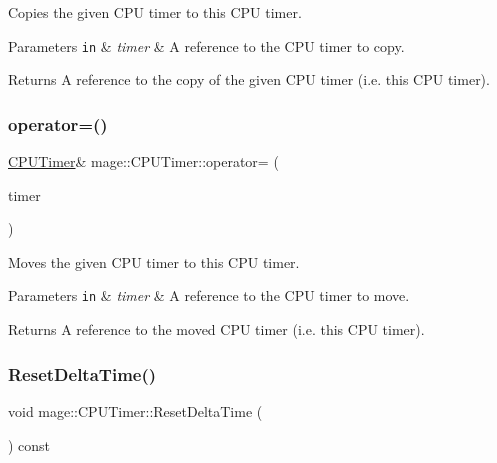 Copies the given C\+PU timer to this C\+PU timer.


\begin{DoxyParams}[1]{Parameters}
\mbox{\tt in}  & {\em timer} & A reference to the C\+PU timer to copy. \\
\hline
\end{DoxyParams}
\begin{DoxyReturn}{Returns}
A reference to the copy of the given C\+PU timer (i.\+e. this C\+PU timer). 
\end{DoxyReturn}
\hypertarget{classmage_1_1_c_p_u_timer_aee546b06c3b665bc1868abc3d7e3a06d}{}\label{classmage_1_1_c_p_u_timer_aee546b06c3b665bc1868abc3d7e3a06d} 
\subsubsection{\texorpdfstring{operator=()}{operator=()}\hspace{0.1cm}{\footnotesize\ttfamily [2/2]}}
{\footnotesize\ttfamily \hyperlink{classmage_1_1_c_p_u_timer}{C\+P\+U\+Timer}\& mage\+::\+C\+P\+U\+Timer\+::operator= (\begin{DoxyParamCaption}\item[{\hyperlink{classmage_1_1_c_p_u_timer}{C\+P\+U\+Timer} \&\&}]{timer }\end{DoxyParamCaption})\hspace{0.3cm}{\ttfamily [default]}}

Moves the given C\+PU timer to this C\+PU timer.


\begin{DoxyParams}[1]{Parameters}
\mbox{\tt in}  & {\em timer} & A reference to the C\+PU timer to move. \\
\hline
\end{DoxyParams}
\begin{DoxyReturn}{Returns}
A reference to the moved C\+PU timer (i.\+e. this C\+PU timer). 
\end{DoxyReturn}
\hypertarget{classmage_1_1_c_p_u_timer_a31f7b301c60a2ea63abfc2d39e8bf96b}{}\label{classmage_1_1_c_p_u_timer_a31f7b301c60a2ea63abfc2d39e8bf96b} 
\subsubsection{\texorpdfstring{Reset\+Delta\+Time()}{ResetDeltaTime()}}
{\footnotesize\ttfamily void mage\+::\+C\+P\+U\+Timer\+::\+Reset\+Delta\+Time (\begin{DoxyParamCaption}{ }\end{DoxyParamCaption}) const\hspace{0.3cm}{\ttfamily [private]}}

